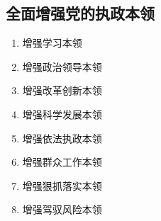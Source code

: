     \subsection{全面增强党的执政本领}
        \begin{enumerate}
            \item 增强学习本领
            \item 增强政治领导本领
            \item 增强改革创新本领
            \item 增强科学发展本领
            \item 增强依法执政本领
            \item 增强群众工作本领
            \item 增强狠抓落实本领
            \item 增强驾驭风险本领
        \end{enumerate}
